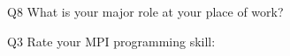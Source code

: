 \begin{description}%
\item{Q8} What is your major role at your place of work?%
\item{Q3} Rate your MPI programming skill:%
\end{description}%
